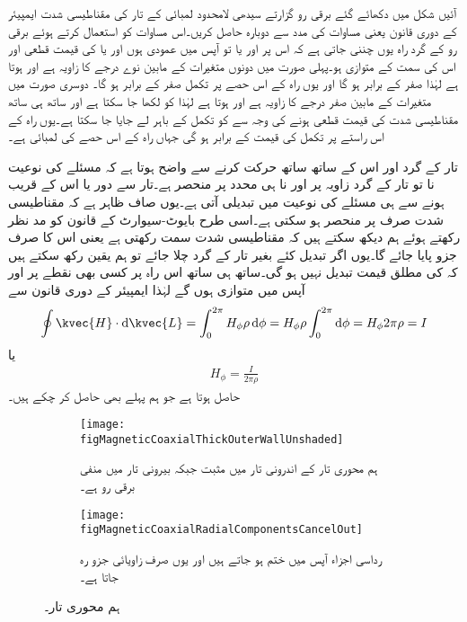 آئیں شکل  میں دکھائے گئے  برقی رو گزارتے سیدھی لامحدود لمبائی کے تار کی مقناطیسی شدت ایمپیئر کے دوری قانون یعنی مساوات  کی مدد سے دوبارہ حاصل کریں۔اس مساوات کو استعمال کرتے ہوئے  برقی رو کے گرد راہ یوں چننی جاتی ہے کہ اس پر  اور  یا تو آپس میں عمودی ہوں اور یا  کی قیمت قطعی اور اس کی سمت  کے متوازی ہو۔پہلی صورت میں دونوں متغیرات کے مابین نوے درجے کا زاویہ  ہے اور  ہوتا ہے لہٰذا  صفر کے برابر ہو گا اور یوں راہ کے اس حصے پر تکمل صفر کے برابر ہو گا۔ دوسری صورت میں متغیرات کے مابین صفر درجے کا زاویہ ہے اور  ہوتا ہے لہٰذا   کو  لکھا جا سکتا ہے اور ساتھ ہی ساتھ مقناطیسی شدت کی قیمت قطعی ہونے کی وجہ سے  کو تکمل کے باہر لے جایا جا سکتا ہے۔یوں راہ کے اس راستے پر تکمل کی قیمت  کے برابر ہو گی جہاں  راہ کے اس حصے کی لمبائی ہے۔

تار کے گرد اور اس کے ساتھ ساتھ حرکت کرنے سے واضح ہوتا ہے کہ مسئلے کی نوعیت نا تو تار کے گرد زاویہ  پر اور نا ہی محدد  پر منحصر ہے۔تار سے دور یا اس کے قریب ہونے سے ہی مسئلے کی نوعیت میں تبدیلی آتی ہے۔یوں صاف ظاہر ہے کہ مقناطیسی شدت صرف  پر منحصر ہو سکتی ہے۔اسی طرح بایوٹ-سیوارٹ کے قانون کو مد نظر رکھتے ہوئے ہم دیکھ سکتے ہیں کہ مقناطیسی شدت  سمت رکھتی ہے یعنی اس کا صرف  جزو پایا جائے گا۔یوں اگر  تبدیل کئے بغیر تار کے گرد چلا جائے تو ہم یقین رکھ سکتے ہیں کہ  کی مطلق قیمت  تبدیل نہیں ہو گی۔ساتھ ہی ساتھ اس راہ پر کسی بھی نقطے پر   اور  آپس میں متوازی ہوں گے لہٰذا ایمپیئر کے دوری قانون سے
\begin{align*}
\oint \kvec{H} \cdot \dif \kvec{L}=\int_0^{2\pi} H_{\phi} \rho \dif \phi=H_{\phi} \rho \int_0^{2\pi} \dif \phi=H_{\phi} 2\pi \rho=I
\end{align*}
یا
\begin{align*}
H_{\phi}=\frac{I}{2\pi \rho}
\end{align*}
حاصل ہوتا ہے جو ہم پہلے بھی حاصل کر چکے ہیں۔
\begin{figure}
\centering
\begin{subfigure}{0.5\textwidth}
\centering
\texttt{[image: figMagneticCoaxialThickOuterWallUnshaded]}
\caption{ہم محوری تار کے اندرونی تار میں مثبت جبکہ بیرونی تار میں منفی برقی رو ہے۔}
\label{شکل_مقناطیسی_ہم_محوری_تار_مثبت_منفی_رو}
\end{subfigure}%
\begin{subfigure}{0.5\textwidth}
\centering
\texttt{[image: figMagneticCoaxialRadialComponentsCancelOut]}
\caption{رداسی اجزاء آپس میں ختم ہو جاتے ہیں اور یوں صرف زاویائی جزو رہ جاتا ہے۔}
\label{شکل_مقناطیسی_ہم_محوری_صرف_زاویائی_جزو}
\end{subfigure}%
\caption{ہم محوری تار۔}
\label{شکل_مقناطیسی_ہم_محوری_تار}
\end{figure}

